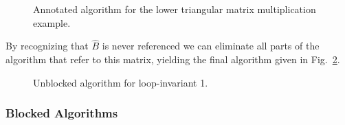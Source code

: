 
\begin{figure}[htbp]
\worksheet
\caption{Annotated algorithm for the lower triangular
matrix multiplication example.}
\label{fig:ws:ltrmm_lln}
\end{figure}

By recognizing that $ \hat{B} $ is never referenced we can eliminate
all parts of the algorithm that refer to this matrix, yielding the
final algorithm given in Fig.~\ref{fig:alg:ltrmm_lln}.


\renewcommand{\partitionings}{
$ 
B \rightarrow \FlaTwoByOne{ B_{T} }
                          { B_{B} }
$
and
$ 
L \rightarrow \FlaTwoByTwo{ L_{TL} }{ 0 }
                          { L_{BL} }{ L_{BR} }
$
}
\renewcommand{\partitionsizes}{
$ B_{B} $ has $ 0 $ rows
and $ L_{BR} $ is $ 0 \times 0 $
}

\renewcommand{\repartitionings}{
$ 
\FlaTwoByOne{ B_T }{ B_B } 
\rightarrow
\FlaThreeByOneT{ B_0 }{ b_1^T }{ B_2 }
$
and
$ \FlaTwoByTwo{ L_{TL} }{ 0 }
            { L_{BL} }{ L_{BR} }
\rightarrow
\FlaThreeByThreeTL{ L_{00} }{ 0 }{ 0 }
                { l_{10}^T }{ \lambda_{11} }{ 0 }
                { L_{20} }{ l_{21} }{ L_{22} }
$
}
\renewcommand{\repartitionsizes}{
$ b_1^T $ is a row 
and $ \lambda_{11} $ is a scalar
}

\renewcommand{\moveboundaries}{%
$ 
\FlaTwoByOne{ B_T }{ B_B } 
\leftarrow
\FlaThreeByOneB{ B_0 }{ b_1^T }{ B_2 }
$
and
$ \FlaTwoByTwo{ L_{TL} }{ 0 }
            { L_{BL} }{ L_{BR} }
\leftarrow
\FlaThreeByThreeBR{ L_{00} }{ 0 }{ 0 }
                { l_{10}^T }{ \lambda_{11} }{ 0 }
                { L_{20} }{ l_{21} }{ L_{22} }
$
}


\begin{figure}[htbp]
\FlaAlgorithm
\caption{Unblocked algorithm for loop-invariant 1.}
\label{fig:alg:ltrmm_lln}
\end{figure}

\subsubsection{Blocked Algorithms}

